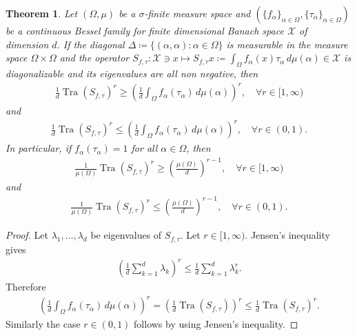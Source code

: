 \documentclass{amsart}
\newtheorem{theorem}{Theorem}[section]
\begin{document}
  \begin{theorem}
  	Let $(\Omega, \mu)$ be a $\sigma$-finite measure space and $(\{f_\alpha\}_{\alpha\in \Omega}, \{\tau_\alpha\}_{\alpha\in \Omega})$ be a 	 continuous Bessel  family for finite dimensional Banach space $\mathcal{X}$ of dimension $d$. If the diagonal $\Delta\coloneqq \{(\alpha, \alpha):\alpha \in \Omega\}$ is measurable in the measure space $\Omega\times \Omega$
  	and the operator $	S_{f, \tau}:\mathcal{X}\ni x \mapsto S_{f, \tau}x\coloneqq \int_{\Omega}f_\alpha(x)\tau_\alpha \, d\mu (\alpha) \in\mathcal{X}$  is diagonalizable and its eigenvalues are all non negative,  then 
  	\begin{align*}
  		\frac{1}{d}	\operatorname{Tra}(S_{f,\tau})^r\geq 	\left(\frac{1}{d}\int_\Omega  f_\alpha(\tau_\alpha)\, d \mu(\alpha)\right)^r ,\quad \forall r \in [1, \infty)
  	\end{align*}	
  	and 
  	\begin{align*}
  		\frac{1}{d}	\operatorname{Tra}(S_{f,\tau})^r\leq 	\left(\frac{1}{d}\int_\Omega  f_\alpha(\tau_\alpha)\, d \mu(\alpha)\right)^r ,\quad \forall r \in (0,1).
  	\end{align*}
  In particular, if $f_\alpha(\tau_\alpha)=1$ for all $\alpha \in \Omega$, then 
  	\begin{align*}
  	\frac{1}{\mu(\Omega)}	\operatorname{Tra}(S_{f,\tau})^r\geq \left(\frac{\mu(\Omega)}{d}\right)^{r-1} ,\quad \forall r \in [1, \infty)
  \end{align*}	
  and 
  \begin{align*}
  	\frac{1}{\mu(\Omega)}	\operatorname{Tra}(S_{f,\tau})^r\leq \left(\frac{\mu(\Omega)}{d}\right)^{r-1} ,\quad \forall r \in (0,1).
  \end{align*}
  \end{theorem}
  \begin{proof}
  	Let $\lambda_1, \dots, \lambda_{d}$ be eigenvalues of $	S_{f,\tau}$. Let $r \in [1, \infty)$. Jensen's inequality	gives 
  	\begin{align*}
  		\left(\frac{1}{d}\sum_{k=1}^d\lambda_k\right)^r\leq \frac{1}{d}\sum_{k=1}^d\lambda_k^r.
  	\end{align*}
  	Therefore
  	\begin{align*}
  		\left(\frac{1}{d}\int_\Omega  f_\alpha(\tau_\alpha)\, d \mu(\alpha)\right)^r=	\left(\frac{1}{d}\operatorname{Tra}(S_{f,\tau})\right)^r\leq \frac{1}{d}\operatorname{Tra}(	S_{f,\tau})^r.
  	\end{align*}
  	Similarly the case $ r \in (0,1)  $ follows by using Jensen's inequality.
  \end{proof}
\end{document}
